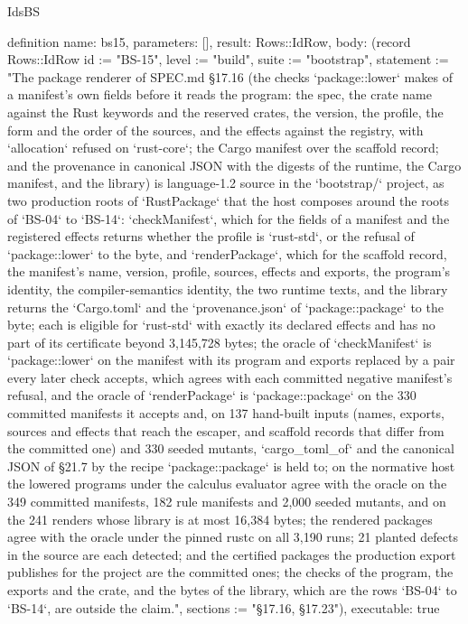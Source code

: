 \begin{lexlean}{IdsBS}
\begin{semanticmodule}
definition{
  name: bs15,
  parameters: [],
  result: Rows::IdRow,
  body: (record Rows::IdRow {id := "BS-15", level := "build", suite := "bootstrap", statement := "The package renderer of SPEC.md §17.16 (the checks `package::lower` makes of a manifest's own fields before it reads the program: the spec, the crate name against the Rust keywords and the reserved crates, the version, the profile, the form and the order of the sources, and the effects against the registry, with `allocation` refused on `rust-core`; the Cargo manifest over the scaffold record; and the provenance in canonical JSON with the digests of the runtime, the Cargo manifest, and the library) is language-1.2 source in the `bootstrap/` project, as two production roots of `RustPackage` that the host composes around the roots of `BS-04` to `BS-14`: `checkManifest`, which for the fields of a manifest and the registered effects returns whether the profile is `rust-std`, or the refusal of `package::lower` to the byte, and `renderPackage`, which for the scaffold record, the manifest's name, version, profile, sources, effects and exports, the program's identity, the compiler-semantics identity, the two runtime texts, and the library returns the `Cargo.toml` and the `provenance.json` of `package::package` to the byte; each is eligible for `rust-std` with exactly its declared effects and has no part of its certificate beyond 3,145,728 bytes; the oracle of `checkManifest` is `package::lower` on the manifest with its program and exports replaced by a pair every later check accepts, which agrees with each committed negative manifest's refusal, and the oracle of `renderPackage` is `package::package` on the 330 committed manifests it accepts and, on 137 hand-built inputs (names, exports, sources and effects that reach the escaper, and scaffold records that differ from the committed one) and 330 seeded mutants, `cargo_toml_of` and the canonical JSON of §21.7 by the recipe `package::package` is held to; on the normative host the lowered programs under the calculus evaluator agree with the oracle on the 349 committed manifests, 182 rule manifests and 2,000 seeded mutants, and on the 241 renders whose library is at most 16,384 bytes; the rendered packages agree with the oracle under the pinned rustc on all 3,190 runs; 21 planted defects in the source are each detected; and the certified packages the production export publishes for the project are the committed ones; the checks of the program, the exports and the crate, and the bytes of the library, which are the rows `BS-04` to `BS-14`, are outside the claim.", sections := "§17.16, §17.23"}),
  executable: true
}


\end{semanticmodule}
\end{lexlean}
